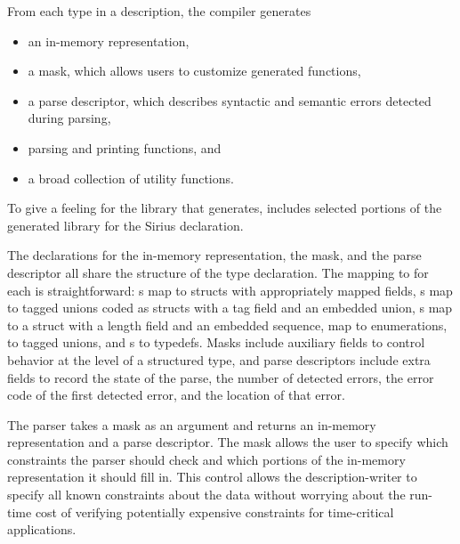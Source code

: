 \documentclass[times]{acm-sigplan}
\newcommand{\dibbler}{Sirius}
\begin{document}
From each type in a \pads{} description, the compiler generates 
\begin{itemize}
\setlength{\itemsep}{0ex plus0.2ex}
\item an in-memory representation, 
\item a mask, which allows users to customize generated functions,
\item a parse descriptor, which describes syntactic and
semantic errors detected during parsing, 
\item parsing and printing functions, and 
\item a broad collection of utility functions.
\end{itemize}
%
\setcounter{totalnumber}{1}
\setcounter{dbltopnumber}{1}
\renewcommand{\topfraction}{0.85}
\renewcommand{\textfraction}{0.1}
\renewcommand{\floatpagefraction}{0.75}
\begin{figure*}
\begin{tiny}

\caption{Selected portions of the library generated for the \texttt{entry\_t}
  declaration from \dibbler{} data description.}
\label{figure:library}
\end{tiny}
\end{figure*}
To give a feeling for the library that \pads{} generates, 
 includes selected portions of the generated 
library for the \dibbler{}  declaration.

The \C{} declarations for the in-memory representation, the mask, 
and the parse descriptor all share the structure of the \pads{}
type declaration.  The mapping to \C{} for each is straightforward: 
s map to \C{} structs with appropriately mapped fields, 
s map to tagged unions coded as \C{} structs with a tag field 
and an embedded 
union, s map to a \C{} struct with a length field and an 
embedded sequence,  map to \C{} enumerations,  
to tagged unions, and s to \C{} typedefs.  Masks include
auxiliary fields to control behavior at the level of a structured
type, and parse descriptors include extra fields to record the 
state of the parse, the number of detected errors, 
the error code of the first detected error, and the location of that error.

The parser takes a mask as an argument and returns an
in-memory representation and a parse descriptor.  
The mask allows the user to specify 
which constraints the parser should check and which portions of the
in-memory representation it should fill in.  This control allows the
description-writer to specify all known constraints about the data
without worrying about the run-time cost of verifying potentially
expensive constraints for time-critical applications.
\end{document}
